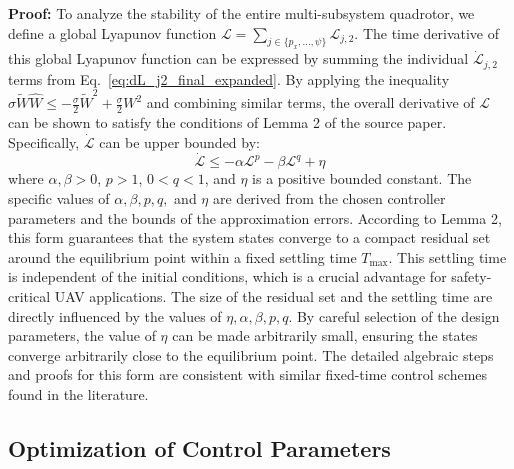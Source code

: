 \textbf{Proof:}
To analyze the stability of the entire multi-subsystem quadrotor, we define a global Lyapunov function $\mathcal{L} = \sum_{j \in \{p_x, \dots, \psi\}} \mathcal{L}_{j,2}$. The time derivative of this global Lyapunov function can be expressed by summing the individual $\dot{\mathcal{L}}_{j,2}$ terms from Eq.~\eqref{eq:dL_j2_final_expanded}. By applying the inequality $\sigma \tilde{W} \hat{W} \le -\frac{\sigma}{2} \tilde{W}^2 + \frac{\sigma}{2} W^2$ and combining similar terms, the overall derivative of $\mathcal{L}$ can be shown to satisfy the conditions of Lemma 2 of the source paper. Specifically, $\dot{\mathcal{L}}$ can be upper bounded by:
\begin{equation}
    \dot{\mathcal{L}} \le -\alpha \mathcal{L}^p - \beta \mathcal{L}^q + \eta \label{eq:global_lyapunov_form}
\end{equation}
where $\alpha, \beta > 0$, $p > 1$, $0 < q < 1$, and $\eta$ is a positive bounded constant. The specific values of $\alpha, \beta, p, q,$ and $\eta$ are derived from the chosen controller parameters and the bounds of the approximation errors.
According to Lemma 2, this form guarantees that the system states converge to a compact residual set around the equilibrium point within a fixed settling time $T_{\max}$. This settling time is independent of the initial conditions, which is a crucial advantage for safety-critical UAV applications. The size of the residual set and the settling time are directly influenced by the values of $\eta, \alpha, \beta, p, q$. By careful selection of the design parameters, the value of $\eta$ can be made arbitrarily small, ensuring the states converge arbitrarily close to the equilibrium point. The detailed algebraic steps and proofs for this form are consistent with similar fixed-time control schemes found in the literature.

\subsection{Optimization of Control Parameters}
\label{sec:optimization_setup}

